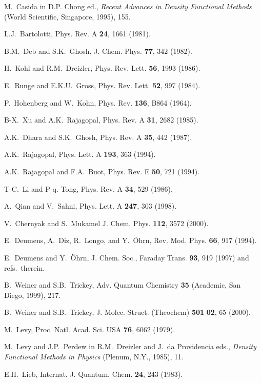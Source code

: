 \begin{references}
 M.~Casida in D.P. Chong ed., {\it Recent Advances in
Density Functional Methods} (World Scientific, Singapore, 1995), 155.

 L.J.~Bartolotti, Phys. Rev. A {\bf 24}, 1661 (1981).

 B.M.~Deb and S.K.~Ghosh, J. Chem. Phys. {\bf 77}, 342
(1982).

 H.~Kohl and R.M.~Dreizler, Phys. Rev. Lett. {\bf 56}, 1993
(1986).

 E.~Runge and E.K.U.~Gross, Phys. Rev. Lett. {\bf 52}, 997
(1984).

 P.~Hohenberg and W.~Kohn, Phys. Rev. {\bf 136}, B864 (1964).

 B-X.~Xu and A.K.~Rajagopal, Phys. Rev. A {\bf 31}, 2682
(1985).

 A.K.~Dhara and S.K.~Ghosh, Phys. Rev. A {\bf 35}, 442
(1987).

 A.K.~Rajagopal, Phys. Lett. A {\bf 193}, 363 (1994).

 A.K.~Rajagopal and F.A.~Buot, Phys. Rev. E {\bf 50},
721 (1994).

 T-C.~Li and P-q. Tong, Phys. Rev. A {\bf 34}, 529 (1986).

 A.~Qian and V.~Sahni, Phys. Lett. A {\bf 247}, 303 (1998).

 V.~Chernyak and S.~Mukamel J. Chem. Phys. {\bf 112},
3572 (2000).

 E.~Deumens, A.~Diz, R.~Longo, and Y.~{\"O}hrn, Rev. Mod.
Phys. {\bf 66}, 917 (1994).

 E.~Deumens and Y.~{\"O}hrn, J. Chem. Soc., Faraday Trans. 
{\bf 93}, 919 (1997) and refs.~therein.

 B.~Weiner and S.B.~Trickey, Adv. Quantum Chemistry {\bf %
35} (Academic, San Diego, 1999), 217.

 B.~Weiner and S.B.~Trickey, J. Molec. Struct. (Theochem) 
{\bf 501}-{\bf 02}, 65 (2000).

 M.~Levy, Proc. Natl. Acad. Sci. USA {\bf 76}, 6062 (1979).

 M.~Levy and J.P.~Perdew in R.M.~Dreizler and J.~da
Providencia eds., {\it Density Functional Methods in Physics} (Plenum, N.Y.,
1985), 11.

 E.H.~Lieb, Internat. J. Quantum. Chem. {\bf 24}, 243 (1983).


\end{references}
